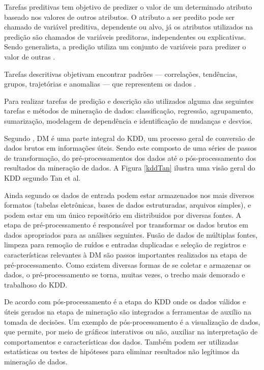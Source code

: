 Tarefas preditivas tem objetivo de predizer o valor de um determinado atributo
baseado nos valores de outros atributos. O atributo a ser predito pode ser
chamado de variável preditiva, dependente ou alvo, já os atributos utilizados na
predição são chamados de variáveis preditoras, independentes ou explicativas.
Sendo generalista, a predição utiliza um conjunto de variáveis para predizer o
valor de outras \cite{fayyad1996data}.

Tarefas descritivas objetivam encontrar padrões --- correlações, tendências,
grupos, trajetórias e anomalias --- que representem os dados
\cite{fayyad1996data}.

Para realizar tarefas de predição e descrição são utilizados alguma das
seguintes tarefas e métodos de mineração de dados: classificação, regressão,
agrupamento, sumarização, modelagem de dependência e identificação de mudanças e
desvios.

Segundo , DM é uma parte integral do KDD, um
processo geral de conversão de dados brutos em informações úteis. Sendo este
composto de uma séries de passos de transformação, do pré-processamentos dos
dados até o pós-processamento dos resultados da mineração de dados. A Figura
\ref{kddTan} ilustra uma visão geral do KDD segundo Tan et al.


Ainda segundo  os dados de entrada podem estar
armazenados nos mais diversos formatos (tabelas eletrônicas, bases de dados
estruturadas, arquivos simples), e podem estar em um único repositório em
distribuidos por diversas fontes. A etapa de pré-processamento é responsável por
transformar os dados brutos em dados apropriados para as análises seguintes.
Fusão de dados de múltiplas fontes, limpeza para remoção de ruídos e entradas
duplicadas e seleção de registros e características relevantes à DM são passos
importantes realizados na etapa de pré-processamento. Como existem diversas
formas de se coletar e armazenar os dados, o pré-processamento se torna, muitas
vezes, o trecho mais demorado e trabalhoso do KDD.

De acordo com  pós-processamento é a etapa do KDD
onde os dados válidos e úteis gerados na etapa de mineração são integrados a
ferramentas de auxílio na tomada de decisões. Um exemplo de pós-processamento é
a visualização de dados, que permite, por meio de gráficos interativos ou não,
auxiliar na interpretação de comportamentos e características dos dados. Também
podem ser utilizadas estatísticas ou testes de hipóteses para eliminar
resultados não legítimos da mineração de dados.

